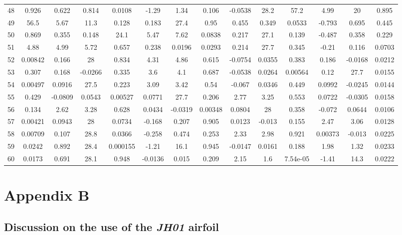 \documentclass[]{aiaa-tc}%
\begin{document}
\begin{table}[h]
{\begin{tabular}{lccccccccccccc}
48 & 0.926 & 0.622 & 0.814 & 0.0108 & -1.29 & 1.34 & 0.106 & -0.0538 & 28.2 & 57.2 & 4.99 & 20 & 0.895\\
49 & 56.5 & 5.67 & 11.3 & 0.128 & 0.183 & 27.4 & 0.95 & 0.455 & 0.349 & 0.0533 & -0.793 & 0.695 & 0.445\\
50 & 0.869 & 0.355 & 0.148 & 24.1 & 5.47 & 7.62 & 0.0838 & 0.217 & 27.1 & 0.139 & -0.487 & 0.358 & 0.229\\
51 & 4.88 & 4.99 & 5.72 & 0.657 & 0.238 & 0.0196 & 0.0293 & 0.214 & 27.7 & 0.345 & -0.21 & 0.116 & 0.0703\\
52 & 0.00842 & 0.166 & 28 & 0.834 & 4.31 & 4.86 & 0.615 & -0.0754 & 0.0355 & 0.383 & 0.186 & -0.0168 & 0.0212\\
53 & 0.307 & 0.168 & -0.0266 & 0.335 & 3.6 & 4.1 & 0.687 & -0.0538 & 0.0264 & 0.00564 & 0.12 & 27.7 & 0.0155\\
54 & 0.00497 & 0.0916 & 27.5 & 0.223 & 3.09 & 3.42 & 0.54 & -0.067 & 0.0346 & 0.449 & 0.0992 & -0.0245 & 0.0144\\
55 & 0.429 & -0.0809 & 0.0543 & 0.00527 & 0.0771 & 27.7 & 0.206 & 2.77 & 3.25 & 0.553 & 0.0722 & -0.0305 & 0.0158\\
56 & 0.134 & 2.62 & 3.28 & 0.628 & 0.0434 & -0.0319 & 0.00348 & 0.0804 & 28 & 0.358 & -0.072 & 0.0644 & 0.0106\\
57 & 0.00421 & 0.0943 & 28 & 0.0734 & -0.168 & 0.207 & 0.905 & 0.0123 & -0.013 & 0.155 & 2.47 & 3.06 & 0.0128\\
58 & 0.00709 & 0.107 & 28.8 & 0.0366 & -0.258 & 0.474 & 0.253 & 2.33 & 2.98 & 0.921 & 0.00373 & -0.013 & 0.0225\\
59 & 0.0242 & 0.892 & 28.4 & 0.000155 & -1.21 & 16.1 & 0.945 & -0.0147 & 0.0161 & 0.188 & 1.98 & 1.32 & 0.0233\\
60 & 0.0173 & 0.691 & 28.1 & 0.948 & -0.0136 & 0.015 & 0.209 & 2.15 & 1.6 & 7.54e-05 & -1.41 & 14.3 & 0.0222 \\
\bottomrule
\end{tabular}}
\end{table}

\section*{Appendix B}

\subsection{Discussion on the use of the \emph{JH01} airfoil}
\end{document}
